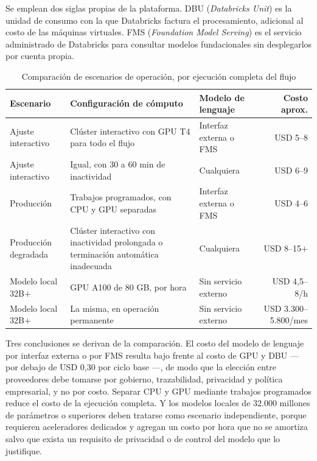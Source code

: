 \documentclass[11pt,a4paper]{article}
\begin{document}
Se emplean dos siglas propias de la plataforma. DBU (\emph{Databricks Unit}) es la unidad de
consumo con la que Databricks factura el procesamiento, adicional al costo de las máquinas
virtuales. FMS (\emph{Foundation Model Serving}) es el servicio administrado de Databricks para
consultar modelos fundacionales sin desplegarlos por cuenta propia.

\begin{table}[H]
\centering
\caption{Comparación de escenarios de operación, por ejecución completa del flujo}
\label{tab:costosdbx}
\small
\begin{tabularx}{\textwidth}{L{3.0cm} X L{3.0cm} r}
\toprule
\textbf{Escenario} & \textbf{Configuración de cómputo} & \textbf{Modelo de lenguaje} & \textbf{Costo aprox.} \\
\midrule
Ajuste interactivo & Clúster interactivo con GPU T4 para todo el flujo & Interfaz externa o FMS & USD 5--8 \\
Ajuste interactivo & Igual, con 30 a 60 min de inactividad & Cualquiera & USD 6--9 \\
Producción & Trabajos programados, con CPU y GPU separadas & Interfaz externa o FMS & USD 4--6 \\
Producción degradada & Clúster interactivo con inactividad prolongada o terminación automática inadecuada & Cualquiera & USD 8--15$+$ \\
\midrule
Modelo local 32B$+$ & GPU A100 de 80 GB, por hora & Sin servicio externo & USD 4,5--8/h \\
Modelo local 32B$+$ & La misma, en operación permanente & Sin servicio externo & USD 3.300--5.800/mes \\
\bottomrule
\end{tabularx}
\end{table}

Tres conclusiones se derivan de la comparación. El costo del modelo de lenguaje por interfaz
externa o por FMS resulta bajo frente al costo de GPU y DBU --- por debajo de USD 0,30 por ciclo
base ---, de modo que la elección entre proveedores debe tomarse por gobierno, trazabilidad,
privacidad y política empresarial, y no por costo. Separar CPU y GPU mediante trabajos
programados reduce el costo de la ejecución completa. Y los modelos locales de 32.000 millones de
parámetros o superiores deben tratarse como escenario independiente, porque requieren
aceleradores dedicados y agregan un costo por hora que no se amortiza salvo que exista un
requisito de privacidad o de control del modelo que lo justifique.
\end{document}
